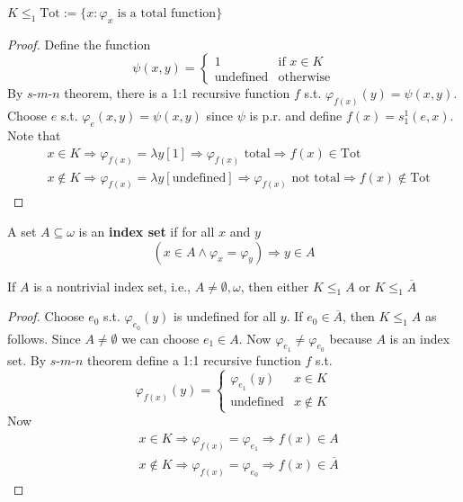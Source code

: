 \documentclass[11pt]{article}
\begin{document}
\begin{theorem}[]
\label{thm4.10}
\(K\le_1\text{Tot}:=\{x:\varphi_x\text{ is a total function}\}\)
\end{theorem}
\begin{proof}
Define the function
\begin{equation*}
\psi(x,y)=
\begin{cases}
1&\text{if } x\in K\\
\text{undefined} &\text{otherwise}
\end{cases}
\end{equation*}
By \(s\)-\(m\)-\(n\) theorem, there is a 1:1 recursive function \(f\) s.t.
\(\varphi_{f(x)}(y)=\psi(x,y)\). Choose \(e\) s.t. \(\varphi_e(x,y)=\psi(x,y)\) 
since \(\psi\) is p.r. and
define \(f(x)=s_1^1(e,x)\). Note that
\begin{align*}
&x\in K\Longrightarrow \varphi_{f(x)}=\lambda y[1]\Longrightarrow\varphi_{f(x)}\text{ total}
\Longrightarrow f(x)\in\text{Tot}\\
&x\not\in K\Longrightarrow\varphi_{f(x)}=\lambda y[\text{undefined}]\Longrightarrow
\varphi_{f(x)}\text{ not total}\Longrightarrow f(x)\not\in\text{Tot}
\end{align*}
\end{proof}

\begin{definition}[]
A set \(A\subseteq\omega\) is an \textbf{index set} if for all \(x\) and \(y\)
\begin{equation*}
(x\in A\wedge\varphi_x=\varphi_y)\Longrightarrow y\in  A
\end{equation*}
\end{definition}

\begin{theorem}[]
If \(A\) is a nontrivial index set, i.e., \(A\neq \emptyset,\omega\), then either
\(K\le_1 A\) or \(K\le_1\overline{A}\)
\end{theorem}

\begin{proof}
Choose \(e_0\) s.t. \(\varphi_{e_0}(y)\) is undefined for all \(y\). If
\(e_0\in\overline{A}\), then \(K\le_1 A\) as follows. Since \(A\neq\emptyset\) we can
choose \(e_1\in A\). Now \(\varphi_{e_1}\neq\varphi_{e_0}\) because \(A\) is an
index set. By \(s\)-\(m\)-\(n\) theorem define a 1:1 recursive function \(f\)
s.t.
\begin{equation*}
\varphi_{f(x)}(y)=
\begin{cases}
\varphi_{e_1}(y)&x\in K\\
\text{undefined}&x\not\in K
\end{cases}
\end{equation*}
Now
\begin{align*}
&x\in K\Longrightarrow\varphi_{f(x)}=\varphi_{e_1}\Longrightarrow f(x)\in A\\
&x\not\in K\Longrightarrow\varphi_{f(x)}=\varphi_{e_0}\Longrightarrow
f(x)\in\overline{A}
\end{align*}
\end{proof}
\end{document}

